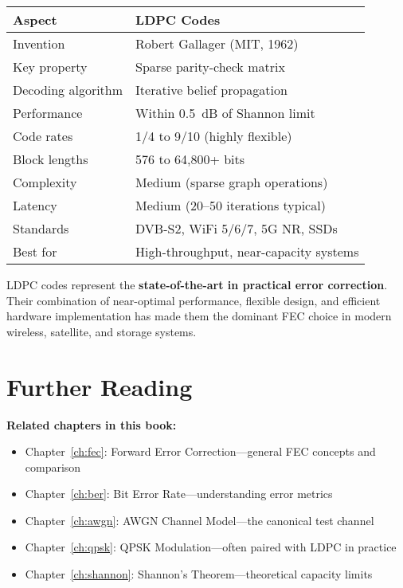 \begin{center}
\begin{tabular}{@{}ll@{}}
\toprule
\textbf{Aspect} & \textbf{LDPC Codes} \\
\midrule
Invention & Robert Gallager (MIT, 1962) \\
Key property & Sparse parity-check matrix \\
Decoding algorithm & Iterative belief propagation \\
Performance & Within 0.5~dB of Shannon limit \\
Code rates & 1/4 to 9/10 (highly flexible) \\
Block lengths & 576 to 64,800+ bits \\
Complexity & Medium (sparse graph operations) \\
Latency & Medium (20--50 iterations typical) \\
Standards & DVB-S2, WiFi 5/6/7, 5G NR, SSDs \\
Best for & High-throughput, near-capacity systems \\
\bottomrule
\end{tabular}
\end{center}

\begin{keyconcept}
LDPC codes represent the \textbf{state-of-the-art in practical error correction}. Their combination of near-optimal performance, flexible design, and efficient hardware implementation has made them the dominant FEC choice in modern wireless, satellite, and storage systems.
\end{keyconcept}

\section{Further Reading}

\textbf{Related chapters in this book:}
\begin{itemize}
\item Chapter~\ref{ch:fec}: Forward Error Correction---general FEC concepts and comparison
\item Chapter~\ref{ch:ber}: Bit Error Rate---understanding error metrics
\item Chapter~\ref{ch:awgn}: AWGN Channel Model---the canonical test channel
\item Chapter~\ref{ch:qpsk}: QPSK Modulation---often paired with LDPC in practice
\item Chapter~\ref{ch:shannon}: Shannon's Theorem---theoretical capacity limits
\end{itemize}

